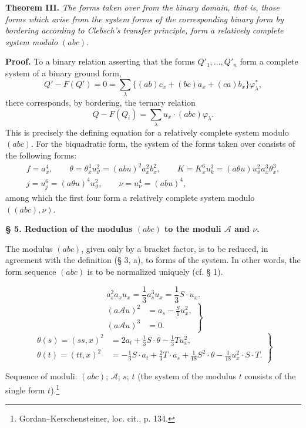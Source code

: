 \documentclass[11pt]{article}
\newcommand{\A}{\mathcal A}
\begin{document}
\noindent\textbf{Theorem III.}
\emph{The forms taken over from the binary domain, that is, those forms which arise from the system forms of the corresponding binary form by bordering according to Clebsch's transfer principle, form a relatively complete system modulo $(abc)$.}

\noindent\textbf{Proof.}
To a binary relation asserting that the forms $Q'_1,\ldots,Q'_n$ form a complete system of a binary ground form,
\[
Q'-F(Q')=0=\sum_\lambda\bigl\{(ab)c_x+(bc)a_x+(ca)b_x\bigr\}\varphi_\lambda^{*},
\]
there corresponds, by bordering, the ternary relation
\[
Q-F(Q_i)=\sum_\lambda u_x\cdot(abc)\varphi_\lambda .
\]
This is precisely the defining equation for a relatively complete system modulo $(abc)$. For the biquadratic form, the system of the forms taken over consists of the following forms:
\[
\begin{gathered}
f=a_x^4,\qquad
\theta=\theta_x^4u_\vartheta^2=(abu)^2a_x^2b_x^2,\qquad
K=K_x^6u_k^3=(a\theta u)u_\vartheta^2a_x^3\theta_x^3,\\
j=u_j^6=(a\theta u)^4u_\vartheta^2,\qquad
\nu=u_\nu^4=(abu)^4,
\end{gathered}
\]
among which the first four form a relatively complete system modulo $((abc),\nu)$.

\begin{center}
\textbf{§ 5. \quad Reduction of the modulus $(abc)$ to the moduli $\A$ and $\nu$.}
\end{center}

The modulus $(abc)$, given only by a bracket factor, is to be reduced, in agreement with the definition (§ 3, a), to forms of the system. In other words, the form sequence $(abc)$ is to be normalized uniquely (cf. § 1).

\[
a_s^2a_xu_x=\frac13 a_s^3u_x=\frac13 S\cdot u_x. \tag{2}
\]
\[
\left.
\begin{aligned}
(a\A u)^2&=a_s-\frac{S}{6}u_x^2,\\
(a\A u)^3&=0.
\end{aligned}
\right\} \tag{3}
\]
\[
\left.
\begin{aligned}
\theta(s)=(ss,x)^2&=2a_t+\frac13 S\cdot\theta-\frac13 Tu_x^2,\\
\theta(t)=(tt,x)^2&=-\frac13 S\cdot a_t+\frac23 T\cdot a_s+\frac1{18}S^2\cdot\theta-\frac1{18}u_x^2\cdot S\cdot T.
\end{aligned}
\right\} \tag{4}
\]

Sequence of moduli: $(abc)$; $\A$; $s$; $t$ (the system of the modulus $t$ consists of the single form $t$).\footnote{Gordan--Kerschensteiner, loc. cit., p. 134.}
\end{document}
